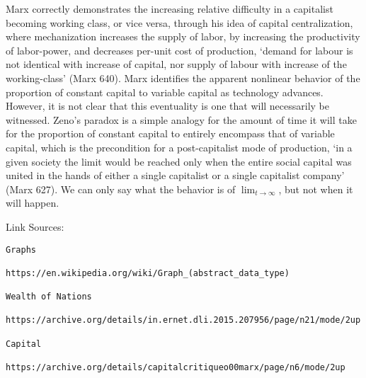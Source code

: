 \documentclass[12pt]{article}
\begin{document}
Marx correctly demonstrates the increasing relative difficulty in a capitalist becoming working class, or vice versa, through his idea of capital centralization, where mechanization increases the supply of labor, by increasing the productivity of labor-power, and decreases per-unit cost of production, `demand for labour is not identical with increase of capital, nor supply of labour with increase of the working-class' (Marx 640).
Marx identifies the apparent nonlinear behavior of the proportion of constant capital to variable capital as technology advances.
However, it is not clear that this eventuality is one that will necessarily be witnessed.
Zeno's paradox is a simple analogy for the amount of time it will take for the proportion of constant capital to entirely encompass that of variable capital, which is the precondition for a post-capitalist mode of production, `in a given society the limit would be reached only when the entire social capital was united in the hands of either a single capitalist or a single capitalist company' (Marx 627).
We can only say what the behavior is of $\lim_{t \to \infty}$, but not when it will happen.

Link Sources:
\begin{verbatim}
Graphs 

https://en.wikipedia.org/wiki/Graph_(abstract_data_type) 

Wealth of Nations

https://archive.org/details/in.ernet.dli.2015.207956/page/n21/mode/2up 

Capital

https://archive.org/details/capitalcritiqueo00marx/page/n6/mode/2up 
\end{verbatim}
\end{document}
